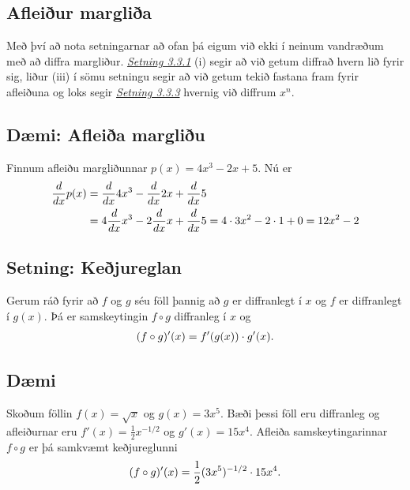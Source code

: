 \documentclass[b5paper,10pt,icelandic]{sphinxmanual}
\begin{document}
\subsection{Afleiður margliða}
\label{kafli03:afleiur-marglia}
Með því að nota setningarnar að ofan þá eigum við ekki í neinum
vandræðum með að diffra margliður. {\hyperref[kafli03:setning\string-3\string-3\string-1]{\emph{Setning 3.3.1}}} (i) segir
að við getum diffrað hvern lið fyrir sig, liður (iii) í sömu setningu
segir að við getum tekið fastana fram fyrir afleiðuna og loks segir
{\hyperref[kafli03:setning\string-3\string-3\string-3]{\emph{Setning 3.3.3}}} hvernig við diffrum \(x^n\).


\subsection{Dæmi: Afleiða margliðu}
\label{kafli03:daemi-afleia-margliu}
Finnum afleiðu margliðunnar \(p(x) = 4x^3-2x + 5\). Nú er
\begin{gather}
\begin{split}\begin{aligned}
\frac{d}{dx} p(x)
&= \frac{d}{dx}4x^3 - \frac{d}{dx}2x + \frac{d}{dx}5 \\
&= 4\frac{d}{dx}x^3 -2\frac{d}{dx}x + \frac{d}{dx}5 =
4\cdot 3x^2 -2\cdot 1 + 0 = 12x^2-2\end{aligned}\end{split}\notag
\end{gather}

\subsection{Setning: Keðjureglan}
\label{kafli03:setning-kejureglan}\label{kafli03:kedjuregla}\label{kafli03:index-4}
Gerum ráð fyrir að \(f\) og \(g\) séu föll þannig að \(g\)
er diffranlegt í \(x\) og \(f\) er diffranlegt í \(g(x)\).
Þá er samskeytingin \(f\circ g\) diffranleg í \(x\) og
\begin{gather}
\begin{split}(f\circ g)'(x) = f'(g(x))\cdot g'(x).\end{split}\notag
\end{gather}

\subsection{Dæmi}
\label{kafli03:id7}
Skoðum föllin \(f(x) = \sqrt x\) og \(g(x) = 3x^5\). Bæði þessi föll eru
diffranleg og afleiðurnar eru \(f'(x) = \frac 12 x^{-1/2}\) og
\(g'(x) = 15x^4\). Afleiða samskeytingarinnar \(f\circ g\) er þá
samkvæmt keðjureglunni
\begin{gather}
\begin{split}(f\circ g)'(x) = \frac 12 (3x^5)^{-1/2} \cdot 15x^4.\end{split}\notag
\end{gather}
\end{document}
